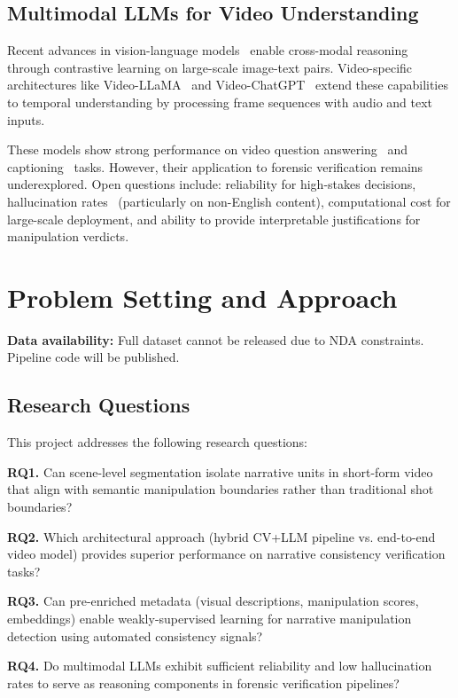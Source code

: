 \documentclass[runningheads]{llncs}
\begin{document}
\subsection{Multimodal LLMs for Video Understanding}

Recent advances in vision-language models~\cite{clip,blip2} enable cross-modal reasoning through contrastive learning on large-scale image-text pairs. Video-specific architectures like Video-LLaMA~\cite{videollama} and Video-ChatGPT~\cite{videochatgpt} extend these capabilities to temporal understanding by processing frame sequences with audio and text inputs.

These models show strong performance on video question answering~\cite{video_qa} and captioning~\cite{video_caption} tasks. However, their application to forensic verification remains underexplored. Open questions include: reliability for high-stakes decisions, hallucination rates~\cite{llm_hallucination} (particularly on non-English content), computational cost for large-scale deployment, and ability to provide interpretable justifications for manipulation verdicts.

\section{Problem Setting and Approach}

\textbf{Data availability:} Full dataset cannot be released due to NDA constraints. Pipeline code will be published.

\subsection{Research Questions}

This project addresses the following research questions:

\textbf{RQ1.} Can scene-level segmentation isolate narrative units in short-form video that align with semantic manipulation boundaries rather than traditional shot boundaries?

\textbf{RQ2.} Which architectural approach (hybrid CV+LLM pipeline vs. end-to-end video model) provides superior performance on narrative consistency verification tasks?

\textbf{RQ3.} Can pre-enriched metadata (visual descriptions, manipulation scores, embeddings) enable weakly-supervised learning for narrative manipulation detection using automated consistency signals?

\textbf{RQ4.} Do multimodal LLMs exhibit sufficient reliability and low hallucination rates to serve as reasoning components in forensic verification pipelines?
\end{document}
